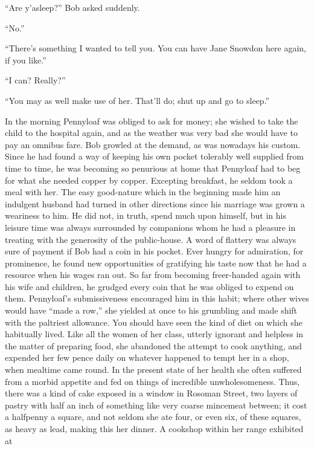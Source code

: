 ``Are y'asleep?'' Bob asked suddenly.

``No.''

``There's something I wanted to tell you. You can have Jane Snowdon here
again, if you like.''

{\protect\hypertarget{41}{}{}}``I can? Really?''

``You may as well make use of her. That'll do; shut up and go to
sleep.''

In the morning Pennyloaf was obliged to ask for money; she wished to
take the child to the hospital again, and as the weather was very bad
she would have to pay an omnibus fare. Bob growled at the demand, as was
nowadays his custom. Since he had found a way of keeping his own pocket
tolerably well supplied from time to time, he was becoming so penurious
at home that Pennyloaf had to beg for what she needed copper by copper.
Excepting breakfast, he seldom took a meal with her. The easy
good-nature which in the beginning made him an indulgent husband had
turned in other directions since his marriage was grown a weariness to
him. He did not, in truth, spend much upon himself, but in his leisure
time was always surrounded by companions whom he had a pleasure in
treating with the generosity of the public-house. A word of flattery was
always sure of payment if Bob had a coin in his pocket. Ever hungry for
admiration, for prominence, he found new opportunities of gratifying his
{\protect\hypertarget{42}{}{}}taste now that he had a resource when his
wages ran out. So far from becoming freer-handed again with his wife and
children, he grudged every coin that he was obliged to expend on them.
Pennyloaf's submissiveness encouraged him in this habit; where other
wives would have ``made a row,'' she yielded at once to his grumbling
and made shift with the paltriest allowance. You should have seen the
kind of diet on which she habitually lived. Like all the women of her
class, utterly ignorant and helpless in the matter of preparing food,
she abandoned the attempt to cook anything, and expended her few pence
daily on whatever happened to tempt her in a shop, when mealtime came
round. In the present state of her health she often suffered from a
morbid appetite and fed on things of incredible unwholesomeness. Thus,
there was a kind of cake exposed in a window in Rosoman Street, two
layers of pastry with half an inch of something like very coarse
mincemeat between; it cost a halfpenny a square, and not seldom she ate
four, or even six, of these squares, as heavy as lead, making this her
dinner. A cookshop within her range exhibited at
